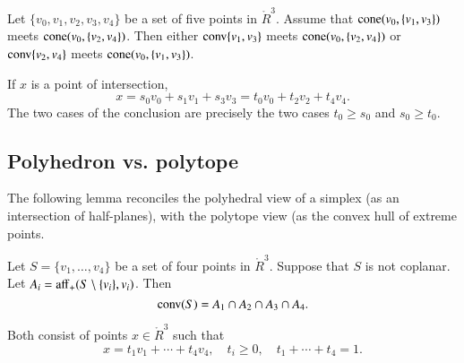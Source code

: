 \begin{tarskidata}
\begin{tarski}

\begin{lemma}
Let $\{v_0,v_1,v_2,v_3,v_4\}$ be a set of five points in $\ring{R}^3$.
Assume that ${\operatorname{cone}}(v_0,\{v_1,v_3\})$ meets
  ${\operatorname{cone}}(v_0,\{v_2,v_4\})$.  Then either
${\operatorname{conv}}\{v_1,v_3\}$ meets ${\operatorname{cone}}(v_0,\{v_2,v_4\})$ or
${\operatorname{conv}}\{v_2,v_4\}$ meets ${\operatorname{cone}}(v_0,\{v_1,v_3\})$.
\end{lemma}

\begin{proved} 
If $x$ is a point of intersection,
  $$
  x = s_0 v_0 + s_1 v_1 + s_3 v_ 3 = t_0 v_0 + t_2 v_2 + t_4 v_4.
  $$
The two cases of the conclusion are precisely the two cases
  $t_0\ge s_0$ and $s_0\ge t_0$.
\swallowed\end{proved}
\end{tarski}





\begin{tarski}
\section{Polyhedron vs. polytope}
The following lemma reconciles the polyhedral view of a simplex
(as an intersection of half-planes), with the polytope view (as
the convex hull of extreme points.


\begin{lemma} 
Let $S=\{v_1,\ldots, v_4\}$ be a set of four points
in $\ring{R}^3$.  Suppose that $S$ is not coplanar.
Let $A_i = {\operatorname{aff}}_+(S\setminus\{v_i\},v_i)$.
Then $${\operatorname{conv}}(S)  = A_1\cap A_2\cap A_3\cap A_4.$$
%
\end{lemma}

\begin{proved}
Both consist of points $x\in\ring{R}^3$ such that
  $$x = t_1 v_1 +\cdots+ t_4 v_4,\quad t_i\ge 0,\quad t_1+\cdots +t_4 =1.
  $$
\swallowed\end{proved}
\end{tarski}




\end{tarskidata}
